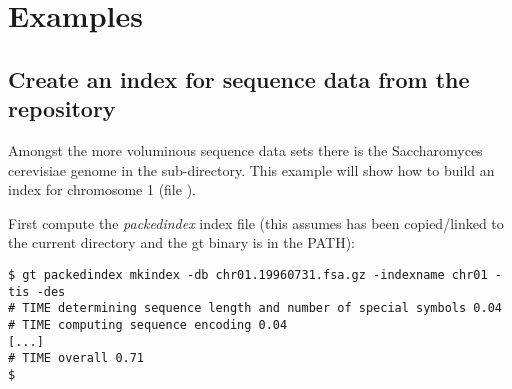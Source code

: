 \documentclass[12pt,titlepage]{article}
\newcommand{\packedindex}{\textit{packedindex}\xspace}
\newcommand{\species}[1]{{\fontshape{it}\selectfont #1}}%
\begin{document}
\begin{Justshowoptions}





\end{Justshowoptions}

\section{Examples}
\label{sec:packedindex:examples}

\subsection{Create an index for sequence data from the
   repository\cite{gttestdata}}
\label{sec:packedindex:examples:yeast}

Amongst the more voluminous sequence data sets there is the
\species{Saccharomyces cerevisiae} genome in the
 sub-directory. This example will show how
to build an index for chromosome 1 (file
).

First compute the \packedindex index file (this assumes
 has been copied/linked to the current
directory and the gt binary is in the PATH):
\begin{footnotesize}
\begin{verbatim}
$ gt packedindex mkindex -db chr01.19960731.fsa.gz -indexname chr01 -tis -des
# TIME determining sequence length and number of special symbols 0.04
# TIME computing sequence encoding 0.04
[...]
# TIME overall 0.71
$
\end{verbatim}
\end{footnotesize}
\end{document}
